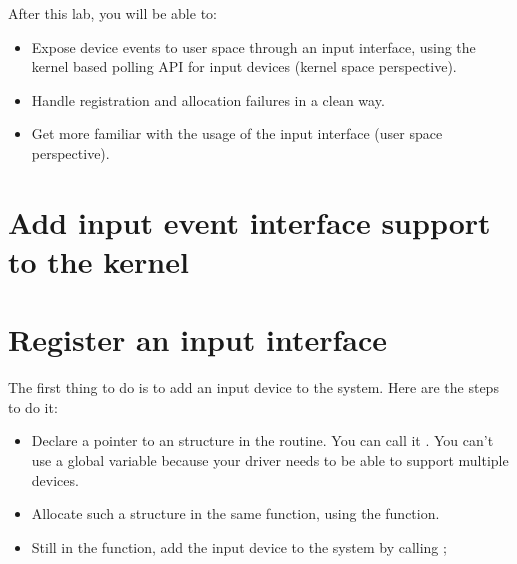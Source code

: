 
After this lab, you will be able to:

\begin{itemize}
\item Expose device events to user space through an input interface,
      using the kernel based polling API for input devices
      (kernel space perspective).
\item Handle registration and allocation failures in a clean
      way.
\item Get more familiar with the usage of the input interface
      (user space perspective).
\end{itemize}

\section{Add input event interface support to the kernel}

\section{Register an input interface}

The first thing to do is to add an input device to the system. Here are
the steps to do it:

\begin{itemize}
\item Declare a pointer to an  structure in the
       routine. You can call it .
      You can't use a global variable because your driver needs to be
      able to support multiple devices.
\item Allocate such a structure in the same function, using the
       function.
\item Still in the  function, add the input device to
      the system by calling ;
\end{itemize}

